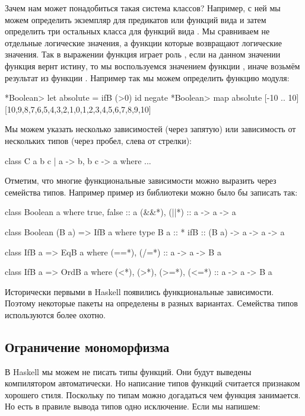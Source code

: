 Зачем нам может понадобиться
такая система классов? Например, с ней мы можем
определить экземпляр  для предикатов
или функций вида  и затем
определить три остальных класса для функций
вида . Мы сравниваем не отдельные 
логические значения, а функции которые 
возвращают логические значения. 
Так в выражении  функция
 играет роль , 
если на данном значении функция 
вернт истину, то мы воспользуемся
значением функции , иначе возьмём
результат из функции . 
Например так мы можем определить функцию модуля:

\begin{code}
*Boolean> let absolute = ifB (>0) id negate
*Boolean> map absolute [-10 .. 10]
[10,9,8,7,6,5,4,3,2,1,0,1,2,3,4,5,6,7,8,9,10]
\end{code}

Мы можем указать несколько зависимостей (через запятую) 
или зависимость от нескольких типов 
(через пробел, слева от стрелки):

\begin{code}
class C a b c | a -> b, b c -> a where
    ...
\end{code}

Отметим, что многие функциональные зависимости
можно выразить через семейства типов. 
Например пример из библиотеки  
можно было бы записать так:

\begin{code}
class Boolean a where
    true, false     :: a
    (&&*), (||*)    :: a -> a -> a

class Boolean (B a) => IfB a where
    type B a :: *
    ifB :: (B a) -> a -> a -> a

class IfB a => EqB a where
    (==*), (/=*) :: a -> a -> B a
               
class IfB a => OrdB a where
    (<*), (>*), (>=*), (<=*) :: a -> a -> B a
\end{code}

Исторически первыми в Haskell появились функциональные зависимости.
Поэтому некоторые пакеты на  определены в разных
вариантах. Семейства типов используются более охотно.


\subsection{Ограничение мономорфизма}

В Haskell мы можем не писать типы функций. Они будут
выведены компилятором автоматически. Но написание 
типов функций считается признаком хорошего стиля. 
Поскольку по типам можно догадаться чем функция
занимается. Но есть в правиле вывода типов одно исключение. 
Если мы напишем:

